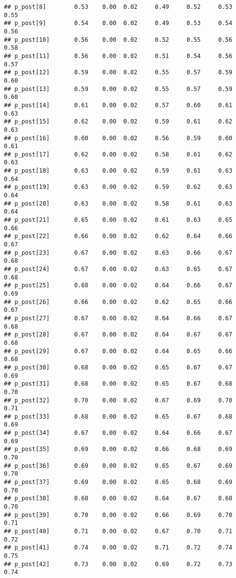 \documentclass{article}\usepackage[]{graphicx}\usepackage[]{color}
\makeatletter
\newenvironment{kframe}{%
 \def\at@end@of@kframe{}%
 \ifinner\ifhmode%
  \def\at@end@of@kframe{\end{minipage}}%
  \begin{minipage}{\columnwidth}%
 \fi\fi%
 \def\FrameCommand##1{\hskip\@totalleftmargin \hskip-\fboxsep
 \colorbox{shadecolor}{##1}\hskip-\fboxsep
     \hskip-\linewidth \hskip-\@totalleftmargin \hskip\columnwidth}%
 \MakeFramed {\advance\hsize-\width
   \@totalleftmargin\z@ \linewidth\hsize
   \@setminipage}}%
 {\par\unskip\endMakeFramed%
 \at@end@of@kframe}
\newenvironment{knitrout}{}{} %
\makeatother
\begin{document}
\begin{knitrout}
\begin{kframe}
\begin{verbatim}
## p_post[8]        0.53    0.00  0.02     0.49     0.52     0.53     0.55
## p_post[9]        0.54    0.00  0.02     0.49     0.53     0.54     0.56
## p_post[10]       0.56    0.00  0.02     0.52     0.55     0.56     0.58
## p_post[11]       0.56    0.00  0.02     0.51     0.54     0.56     0.57
## p_post[12]       0.59    0.00  0.02     0.55     0.57     0.59     0.60
## p_post[13]       0.59    0.00  0.02     0.55     0.57     0.59     0.60
## p_post[14]       0.61    0.00  0.02     0.57     0.60     0.61     0.63
## p_post[15]       0.62    0.00  0.02     0.59     0.61     0.62     0.63
## p_post[16]       0.60    0.00  0.02     0.56     0.59     0.60     0.61
## p_post[17]       0.62    0.00  0.02     0.58     0.61     0.62     0.63
## p_post[18]       0.63    0.00  0.02     0.59     0.61     0.63     0.64
## p_post[19]       0.63    0.00  0.02     0.59     0.62     0.63     0.64
## p_post[20]       0.63    0.00  0.02     0.58     0.61     0.63     0.64
## p_post[21]       0.65    0.00  0.02     0.61     0.63     0.65     0.66
## p_post[22]       0.66    0.00  0.02     0.62     0.64     0.66     0.67
## p_post[23]       0.67    0.00  0.02     0.63     0.66     0.67     0.68
## p_post[24]       0.67    0.00  0.02     0.63     0.65     0.67     0.68
## p_post[25]       0.68    0.00  0.02     0.64     0.66     0.67     0.69
## p_post[26]       0.66    0.00  0.02     0.62     0.65     0.66     0.67
## p_post[27]       0.67    0.00  0.02     0.64     0.66     0.67     0.68
## p_post[28]       0.67    0.00  0.02     0.64     0.67     0.67     0.68
## p_post[29]       0.67    0.00  0.02     0.64     0.65     0.66     0.68
## p_post[30]       0.68    0.00  0.02     0.65     0.67     0.67     0.69
## p_post[31]       0.68    0.00  0.02     0.65     0.67     0.68     0.70
## p_post[32]       0.70    0.00  0.02     0.67     0.69     0.70     0.71
## p_post[33]       0.68    0.00  0.02     0.65     0.67     0.68     0.69
## p_post[34]       0.67    0.00  0.02     0.64     0.66     0.67     0.69
## p_post[35]       0.69    0.00  0.02     0.66     0.68     0.69     0.70
## p_post[36]       0.69    0.00  0.02     0.65     0.67     0.69     0.70
## p_post[37]       0.69    0.00  0.02     0.65     0.68     0.69     0.70
## p_post[38]       0.68    0.00  0.02     0.64     0.67     0.68     0.70
## p_post[39]       0.70    0.00  0.02     0.66     0.69     0.70     0.71
## p_post[40]       0.71    0.00  0.02     0.67     0.70     0.71     0.72
## p_post[41]       0.74    0.00  0.02     0.71     0.72     0.74     0.75
## p_post[42]       0.73    0.00  0.02     0.69     0.72     0.73     0.74

\end{verbatim}
\end{kframe}
\end{knitrout}
\end{document}
